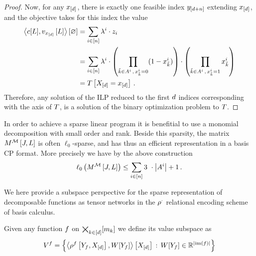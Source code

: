 \begin{proof}
	Now, for any $x_{[d]}$, there is exactly one feasible index $y_{[d+n]}$ extending $x_{[d]}$, and the objective takes for this index the value 
	\begin{align*}
	 	 \left\langle c[L], v_{x_{[d]}}\left[L\right]\right\rangle \left[ \varnothing \right] 
		 &= \sum_{i\in[n]} \lambda^{i} \cdot z_{i} \\
		 &= \sum_{i\in[n]} \lambda^{i} \cdot \left( \prod_{\tilde{k}\in A^{i} \, , \,  x_{\tilde{k}}^i = 0} (1 - x_{\tilde{k}}^i) \right)
		\cdot \left( \prod_{\tilde{k}\in A^{i} \, , \,  x_{\tilde{k}}^i = 1}  x_{\tilde{k}}^i \right)  \\
		& = T\left[X_{[d]}=x_{[d]}\right] \, . 
	 \end{align*}
	 Therefore, any solution of the ILP reduced to the first $d$ indices corresponding with the axis of $T$, is a solution of the binary optimization problem to $T$.
\end{proof}



In order to achieve a sparse linear program it is benefitial to use a monomial decomposition with small order and rank.
Beside this sparsity, the matrix $M^{\mathcal{M}}\left[J,L\right]$ is often $\ell_0$-sparse, and has thus an efficient representation in a basis CP format.
More precisely we have by the above construction 
\begin{align*}
	\sparsityof{\matrixofat{\sliceset}{\datvariable,\selvariable}} \leq \sum_{\decindexin} 3 \cdot \cardof{\variablesetof{\decindex}} +1 \, . 
\end{align*}


\label{sec:HT}


We here provide a subspace perspective for the sparse representation of decomposable functions as tensor networks in the $\rho^{\cdot}$ relational encoding scheme of basis calculus.

\begin{definition}
	Given any function $f$ on $\bigtimes_{k\in[d]}[m_{k}]$ we define its value subspace as 
		\[ V^{f}
		= \left\{\left\langle \rho^{f}\left[Y_{f},X_{[d]}\right],W[Y_{f}]\right\rangle \left[ X_{[d]} \right] \, : \, W[Y_{f}] \in \mathbb{R}^{\left|\mathrm{im}\left(f\right)\right|} \right\} \]
\end{definition}

